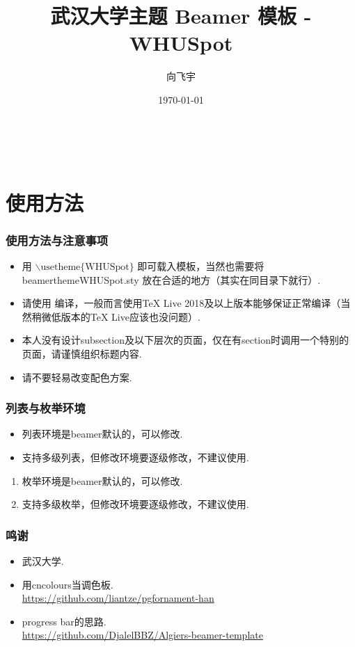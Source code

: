 \documentclass{beamer}
\title{武汉大学主题 Beamer 模板 - WHUSpot}
\author{向飞宇}
\institute{武汉大学}
\date{\today}
\begin{document}
\begin{frame}
    \frametitle{\\}
    \titlepage
\end{frame}

\section{使用方法}

\begin{frame}
    \frametitle{使用方法与注意事项}
    \begin{itemize}
        \item 用 $\backslash \mbox{usetheme\{WHUSpot\}}$ 即可载入模板，当然也需要将 beamerthemeWHUSpot.sty 放在合适的地方（其实在同目录下就行）.
        \item 请使用  编译，一般而言使用\alert{TeX Live 2018}及以上版本能够保证正常编译（当然稍微低版本的TeX Live应该也没问题）.
        \item 本人\alert{没有设计subsection及以下层次}的页面，仅在有section时调用一个特别的页面，请谨慎组织标题内容.
        \item 请不要轻易改变配色方案.
    \end{itemize}
\end{frame}

\begin{frame}
    \frametitle{列表与枚举环境}
    \begin{itemize}
        \item 列表环境是beamer默认的，可以修改. \pause
        \item 支持多级列表，但修改环境要逐级修改，\alert{不建议}使用. \pause
    \end{itemize}

    \begin{enumerate}
        \item 枚举环境是beamer默认的，可以修改. \pause
        \item 支持多级枚举，但修改环境要逐级修改，\alert{不建议}使用.
    \end{enumerate}
\end{frame}

\begin{frame}
    \frametitle{鸣谢}
    \begin{itemize}
        \item 武汉大学.
        \item 用cncolours当调色板. \\ \url{https://github.com/liantze/pgfornament-han}
        \item progress bar的思路. \\ \url{https://github.com/DjalelBBZ/Algiers-beamer-template} 
    \end{itemize}
\end{frame}
\end{document}
